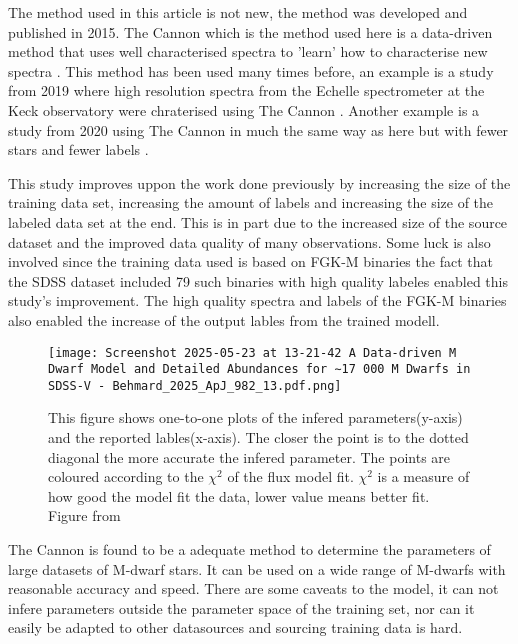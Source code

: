 \documentclass[a4paper]{article}
\begin{document}
The method used in this article is not new, the method was developed and published in 2015. The Cannon which is the method used here is a data-driven method that uses well characterised spectra to 'learn' how to characterise new spectra \citep{2015ApJ...808...16N}. This method has been used many times before, an example is a study from 2019 where high resolution spectra from the Echelle spectrometer at the Keck observatory were chraterised using The Cannon \citep{2019ApJ...876...68B}. Another example is a study from 2020 using The Cannon in much the same way as here but with fewer stars and fewer labels \citep{2020ApJ...892...31B}. 

\pagebreak

This study improves uppon the work done previously by increasing the size of the training data set, increasing the amount of labels and increasing the size of the labeled data set at the end. This is in part due to the increased size of the source dataset and the improved data quality of many observations. Some luck is also involved since the training data used is based on FGK-M binaries the fact that the SDSS dataset included 79 such binaries with high quality labeles enabled this study's improvement. The high quality spectra and labels of the FGK-M binaries also enabled the increase of the output lables from the trained modell.

\begin{figure}[H]
  \begin{small}
    \begin{center}
      \texttt{[image: Screenshot 2025-05-23 at 13-21-42 A Data-driven M Dwarf Model and Detailed Abundances for ​​​​​​∼17 000 M Dwarfs in SDSS-V - Behmard\_2025\_ApJ\_982\_13.pdf.png]}
    \end{center}
    \caption{This figure shows one-to-one plots of the infered parameters(y-axis) and the reported lables(x-axis). The closer the point is to the dotted diagonal the more accurate the infered parameter. The points are coloured according to the $\chi^2$ of the flux model fit. $\chi^2$ is a measure of how good the model fit the data, lower value means better fit.  Figure from \citep{2025ApJ...982...13B}}
    \label{fig:accuracy}
  \end{small}
\end{figure}

The Cannon is found to be a adequate method to determine the parameters of large datasets of M-dwarf stars. It can be used on a wide range of M-dwarfs with reasonable accuracy and speed. There are some caveats to the model, it can not infere parameters outside the parameter space of the training set, nor can it easily be adapted to other datasources and sourcing training data is hard. 
\end{document}
